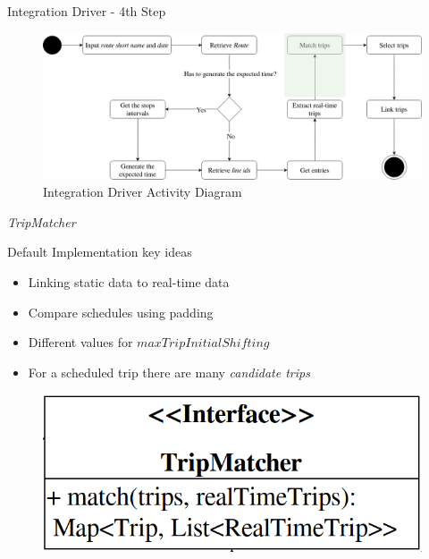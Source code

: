 \documentclass[xcolor=dvipsnames,table]{beamer}
\begin{document}
\begin{frame}{Integration Driver - 4th Step}
        \begin{figure}[H]
                \centering
                \includegraphics[width = \textwidth]{images/integrationDriverAD(4th_step).png}
                \caption{Integration Driver Activity Diagram}
        \end{figure}
\end{frame}
\begin{frame}{\textit{TripMatcher}}
        \begin{block}{Default Implementation key ideas}
                \begin{itemize}
                        \item Linking static data to real-time data
                        \item Compare schedules using padding
                        \item Different values for $maxTripInitialShifting$
                        \item For a scheduled trip there are many {\em candidate trips}
                \end{itemize}
        \end{block}
        \begin{figure}[H]
                \centering
                \includegraphics[scale=0.25]{images/TripMatcher.png}
        \end{figure}
\end{frame}
\end{document}
